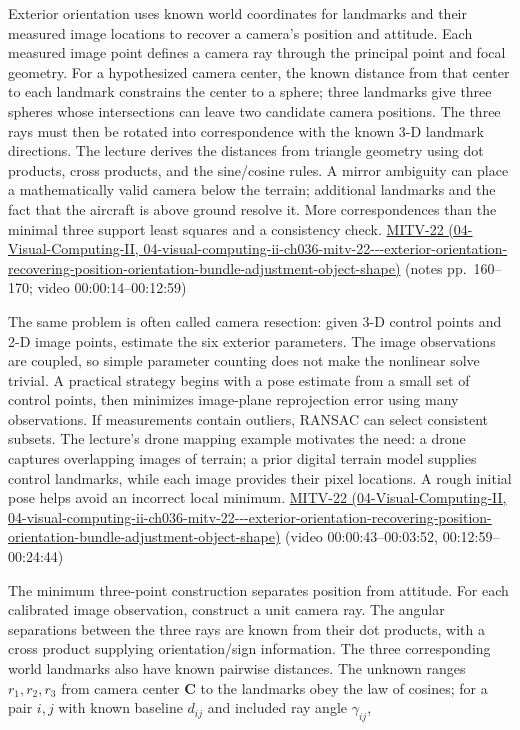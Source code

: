 Exterior orientation uses known world coordinates for landmarks and their measured image locations to recover a camera's position and attitude. Each measured image point defines a camera ray through the principal point and focal geometry. For a hypothesized camera center, the known distance from that center to each landmark constrains the center to a sphere; three landmarks give three spheres whose intersections can leave two candidate camera positions. The three rays must then be rotated into correspondence with the known 3-D landmark directions. The lecture derives the distances from triangle geometry using dot products, cross products, and the sine/cosine rules. A mirror ambiguity can place a mathematically valid camera below the terrain; additional landmarks and the fact that the aircraft is above ground resolve it. More correspondences than the minimal three support least squares and a consistency check. \href{../04-Visual-Computing-II/main.pdf\#nameddest=04-visual-computing-ii-ch036-mitv-22---exterior-orientation-recovering-position-orientation-bundle-adjustment-object-shape}{MITV-22 (04-Visual-Computing-II, 04-visual-computing-ii-ch036-mitv-22-\/-\/-exterior-orientation-recovering-position-orientation-bundle-adjustment-object-shape)} (notes pp.~160--170; video 00:00:14--00:12:59)

The same problem is often called camera resection: given 3-D control points and 2-D image points, estimate the six exterior parameters. The image observations are coupled, so simple parameter counting does not make the nonlinear solve trivial. A practical strategy begins with a pose estimate from a small set of control points, then minimizes image-plane reprojection error using many observations. If measurements contain outliers, RANSAC can select consistent subsets. The lecture's drone mapping example motivates the need: a drone captures overlapping images of terrain; a prior digital terrain model supplies control landmarks, while each image provides their pixel locations. A rough initial pose helps avoid an incorrect local minimum. \href{../04-Visual-Computing-II/main.pdf\#nameddest=04-visual-computing-ii-ch036-mitv-22---exterior-orientation-recovering-position-orientation-bundle-adjustment-object-shape}{MITV-22 (04-Visual-Computing-II, 04-visual-computing-ii-ch036-mitv-22-\/-\/-exterior-orientation-recovering-position-orientation-bundle-adjustment-object-shape)} (video 00:00:43--00:03:52, 00:12:59--00:24:44)

The minimum three-point construction separates position from attitude. For each calibrated image observation, construct a unit camera ray. The angular separations between the three rays are known from their dot products, with a cross product supplying orientation/sign information. The three corresponding world landmarks also have known pairwise distances. The unknown ranges \(r_1,r_2,r_3\) from camera center \(\mathbf C\) to the landmarks obey the law of cosines; for a pair \(i,j\) with known baseline \(d_{ij}\) and included ray angle \(\gamma_{ij}\),


